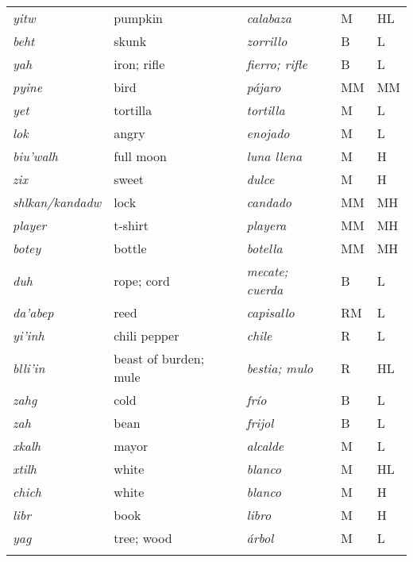 \begin{longtable}{lllll}
 \textit{yitw}   & pumpkin & \textit{calabaza} & M & HL \\
 \textit{beht}   & skunk & \textit{zorrillo} & B & L \\
 \textit{yah}    & iron; rifle & \textit{fierro; rifle} & B & L \\
 \textit{pyine}  & bird & \textit{pájaro} & MM & MM \\
 \textit{yet}    & tortilla & \textit{tortilla} & M & L \\
 \textit{lok}    & angry & \textit{enojado} & M & L \\
 \textit{biu'walh} & full moon & \textit{luna llena} & M & H \\
 \textit{zix}    & sweet & \textit{dulce} & M & H \\
 \textit{shlkan/kandadw} & lock & \textit{candado} & MM & MH \\
 \textit{player} & t-shirt & \textit{playera} & MM & MH \\
 \textit{botey}  & bottle  & \textit{botella} & MM & MH \\
 \textit{duh}    & rope; cord & \textit{mecate; cuerda} & B & L \\
 \textit{da'abep}    & reed & \textit{capisallo} & RM & L \\
 \textit{yi'inh} & chili pepper & \textit{chile} & R & L \\
 \textit{blli'in} & beast of burden; mule & \textit{bestia; mulo} & R & HL \\
 \textit{zahg} & cold & \textit{frío} & B & L \\
 \textit{zah}    & bean & \textit{frijol} & B & L \\
 \textit{xkalh}  & mayor & \textit{alcalde} & M & L \\
 \textit{xtilh}  & white & \textit{blanco}  & M & HL \\
 \textit{chich}  & white & \textit{blanco} & M & H      \\
 \textit{libr}   & book & \textit{libro} & M & H \\
 \textit{yag}    & tree; wood & \textit{árbol} & M & L \\
\lspbottomrule
\end{longtable}
